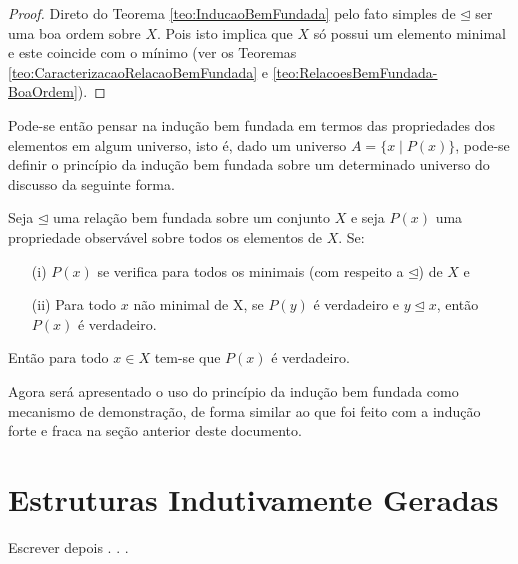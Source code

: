 \begin{proof}
	Direto do Teorema \ref{teo:InducaoBemFundada} pelo fato simples de $\unlhd$ ser uma boa ordem sobre $X$. Pois isto implica que $X$ só possui um elemento minimal e este coincide com o mínimo (ver os Teoremas \ref{teo:CaracterizacaoRelacaoBemFundada} e \ref{teo:RelacoesBemFundada-BoaOrdem}).
\end{proof}

Pode-se então pensar na indução bem fundada em termos das propriedades dos elementos em algum universo, isto é, dado um universo $A = \{x \mid P(x)\}$, pode-se definir o princípio da indução bem fundada sobre um determinado universo do discusso da seguinte forma.

\begin{definicao}\label{def:InducaoBemFundada}
	Seja $\unlhd$ uma relação bem fundada sobre um conjunto $X$ e seja $P(x)$ uma propriedade observável sobre todos os elementos de $X$. Se:
	\begin{itemize}
		\item[(i)] $P(x)$ se verifica para todos os minimais (com respeito a $\unlhd$) de $X$ e
		\item[(ii)] Para todo $x$ não minimal de X, se $P(y)$ é verdadeiro e $y \unlhd x$, então $P(x)$ é verdadeiro.
	\end{itemize}
	Então para todo $x \in X$ tem-se que $P(x)$ é verdadeiro.
\end{definicao}

Agora será apresentado o uso do princípio da indução bem fundada como mecanismo de demonstração, de forma similar ao que foi feito com a indução forte e fraca na seção anterior deste documento.

\section{Estruturas Indutivamente Geradas}\label{sec:InducaoEstrutural}

Escrever depois . . .
